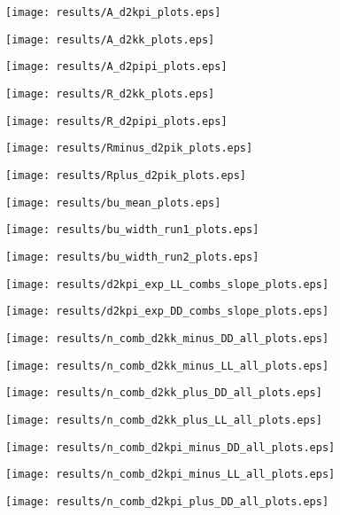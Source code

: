 \documentclass[11pt,a4paper]{article}
\begin{document}
\texttt{[image: results/A\_d2kpi\_plots.eps]}

\texttt{[image: results/A\_d2kk\_plots.eps]}

\texttt{[image: results/A\_d2pipi\_plots.eps]}


\texttt{[image: results/R\_d2kk\_plots.eps]}

\texttt{[image: results/R\_d2pipi\_plots.eps]}


\texttt{[image: results/Rminus\_d2pik\_plots.eps]}

\texttt{[image: results/Rplus\_d2pik\_plots.eps]}


\texttt{[image: results/bu\_mean\_plots.eps]}


\texttt{[image: results/bu\_width\_run1\_plots.eps]}

\texttt{[image: results/bu\_width\_run2\_plots.eps]}

\texttt{[image: results/d2kpi\_exp\_LL\_combs\_slope\_plots.eps]}

\texttt{[image: results/d2kpi\_exp\_DD\_combs\_slope\_plots.eps]}

\iffalse
\texttt{[image: results/n\_comb\_d2kk\_minus\_DD\_all\_plots.eps]}

\texttt{[image: results/n\_comb\_d2kk\_minus\_LL\_all\_plots.eps]}

\texttt{[image: results/n\_comb\_d2kk\_plus\_DD\_all\_plots.eps]}

\texttt{[image: results/n\_comb\_d2kk\_plus\_LL\_all\_plots.eps]}

\texttt{[image: results/n\_comb\_d2kpi\_minus\_DD\_all\_plots.eps]}

\texttt{[image: results/n\_comb\_d2kpi\_minus\_LL\_all\_plots.eps]}

\texttt{[image: results/n\_comb\_d2kpi\_plus\_DD\_all\_plots.eps]}
\end{document}
